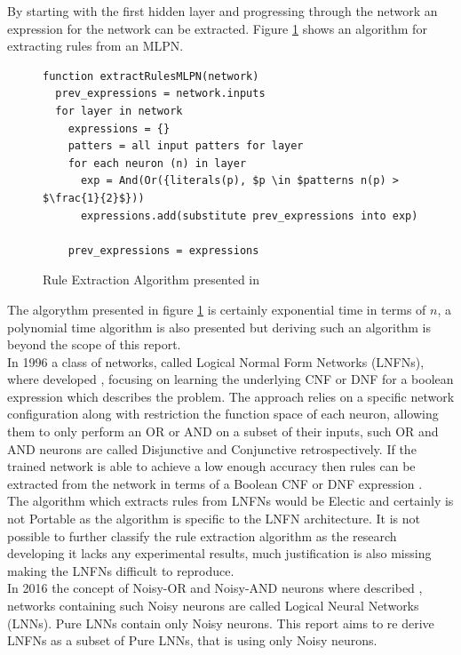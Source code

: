 By starting with the first hidden layer and progressing through the network an expression for the network can be extracted. Figure \ref{alg:rule-extraction-tsukimoto} shows an algorithm for extracting rules from an MLPN.

\begin{figure}[H]
\begin{lstlisting}[mathescape=true]
function extractRulesMLPN(network)
  prev_expressions = network.inputs
  for layer in network
    expressions = {}
    patters = all input patters for layer
    for each neuron (n) in layer
      exp = And(Or({literals(p), $p \in $patterns n(p) > $\frac{1}{2}$}))
      expressions.add(substitute prev_expressions into exp)
	  
    prev_expressions = expressions
\end{lstlisting}
	\caption{Rule Extraction Algorithm presented in \cite{tsukimoto2000extracting}}
	\label{alg:rule-extraction-tsukimoto}
\end{figure}

The algorythm presented in figure \ref{alg:rule-extraction-tsukimoto} is certainly exponential time in terms of $n$, a polynomial time algorithm is also presented but deriving such an algorithm is beyond the scope of this report.\\

In 1996 a class of networks, called Logical Normal Form Networks (LNFNs), where developed \cite{herrmann1996backpropagation}, focusing on learning the underlying CNF or DNF for a boolean expression which describes the problem. The approach relies on a specific network configuration along with restriction the function space of each neuron, allowing them to only perform an OR or AND on a subset of their inputs, such OR and AND neurons are called Disjunctive and Conjunctive retrospectively. If the trained network is able to achieve a low enough accuracy then rules can be extracted from the network in terms of a Boolean CNF or DNF expression \cite{herrmann1996backpropagation}.\\

The algorithm which extracts rules from LNFNs would be Electic and certainly is not Portable as the algorithm is specific to the LNFN architecture. It is not possible to further classify the rule extraction algorithm as the research developing it lacks any experimental results, much justification is also missing making the LNFNs difficult to reproduce.\\

In 2016 the concept of Noisy-OR and Noisy-AND neurons where described \cite{LearningLogicalActivations}, networks containing such Noisy neurons are called Logical Neural Networks (LNNs). Pure LNNs contain only Noisy neurons. This report aims to re derive LNFNs as a subset of Pure LNNs, that is using only Noisy neurons.\\

